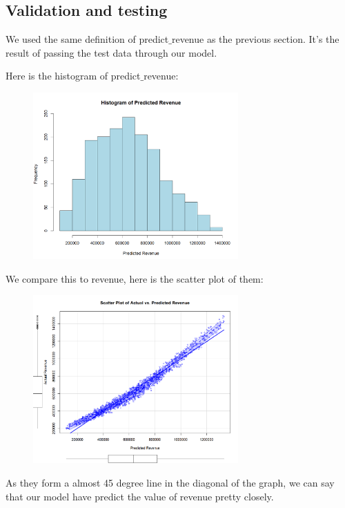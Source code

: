 \subsection{Validation and testing}

We used the same definition of predict$\_$revenue as the previous section. It's the result of passing the test data through our model.

Here is the histogram of predict$\_$revenue:


\begin{figure}[H]
\centering
\includegraphics[width=0.7\textwidth]{img/h1b21.png}
\label{fig:scaled_revenue_distribution}
\end{figure}

We compare this to revenue, here is the scatter plot of them:

\begin{figure}[H]
\centering
\includegraphics[width=0.7\textwidth]{img/h2b21.png}
\label{fig:scaled_revenue_distribution}
\end{figure}

As they form a almost 45 degree line in the diagonal of the graph, we can say that our model have predict the value of revenue pretty closely.



